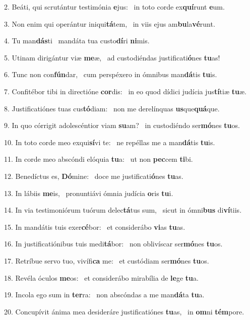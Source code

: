 2. Beáti, qui scrutántur testimónia \textbf{e}jus: \ast\  in toto corde ex\textbf{quí}runt \textbf{e}um.\

3. Non enim qui operántur iniqui\textbf{tá}tem, \ast\  in viis ejus am\textbf{bu}la\textbf{vé}runt.\

4. Tu man\textbf{dás}ti \ast\  mandáta tua custo\textbf{dí}ri \textbf{ni}mis.\

5. Utinam dirigántur viæ \textbf{me}æ, \ast\  ad custodiéndas justificati\textbf{ó}nes \textbf{tu}as!\

6. Tunc non con\textbf{fún}dar, \ast\  cum perspéxero in ómnibus man\textbf{dá}tis \textbf{tu}is.\

7. Confitébor tibi in directióne \textbf{cor}dis: \ast\  in eo quod dídici judícia jus\textbf{tí}tiæ \textbf{tu}æ.\

8. Justificatiónes tuas cus\textbf{tó}diam: \ast\  non me derelínquas \textbf{us}que\textbf{quá}que.\

9. In quo córrigit adolescéntior viam \textbf{su}am? \ast\  in custodiéndo ser\textbf{mó}nes \textbf{tu}os.\

10. In toto corde meo exqui\textbf{sí}vi te: \ast\  ne repéllas me a man\textbf{dá}tis \textbf{tu}is.\

11. In corde meo abscóndi elóquia \textbf{tu}a: \ast\  ut non \textbf{pec}cem \textbf{ti}bi.\

12. Benedíctus es, \textbf{Dó}mine: \ast\  doce me justificati\textbf{ó}nes \textbf{tu}as.\

13. In lábiis \textbf{me}is, \ast\  pronuntiávi ómnia judícia \textbf{o}ris \textbf{tu}i.\

14. In via testimoniórum tuórum delec\textbf{tá}tus sum, \ast\  sicut in ómni\textbf{bus} di\textbf{ví}tiis.\

15. In mandátis tuis exer\textbf{cé}bor: \ast\  et considerábo \textbf{vi}as \textbf{tu}as.\

16. In justificatiónibus tuis medi\textbf{tá}bor: \ast\  non oblivíscar ser\textbf{mó}nes \textbf{tu}os.\

17. Retríbue servo tuo, vivífi\textbf{ca} me: \ast\  et custódiam ser\textbf{mó}nes \textbf{tu}os.\

18. Revéla óculos \textbf{me}os: \ast\  et considerábo mirabília de \textbf{le}ge \textbf{tu}a.\

19. Incola ego sum in \textbf{ter}ra: \ast\  non abscóndas a me man\textbf{dá}ta \textbf{tu}a.\

20. Concupívit ánima mea desideráre justificatiónes \textbf{tu}as, \ast\  in \textbf{om}ni \textbf{tém}pore.\

